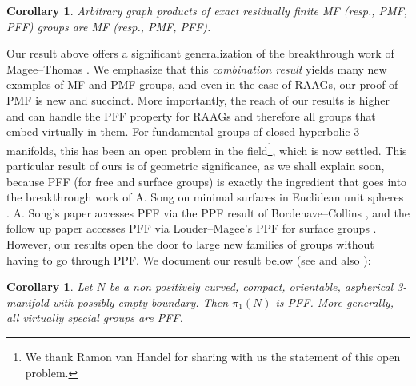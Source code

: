 \documentclass[10pt]{amsart}
\newtheorem{col}[thm]{Corollary}
\theoremstyle{definition}
\begin{document}
\begin{col}\label{graph pdoructs cor}
    Arbitrary graph products of exact residually finite MF (resp., PMF, PFF) groups are MF (resp., PMF, PFF). 
\end{col}

Our result above offers a significant generalization of the breakthrough work of Magee--Thomas \cite{MageeThomas2023}. We emphasize that this \emph{combination result} yields many new examples of MF and PMF groups, and even in the case of RAAGs, our proof of PMF is new and succinct. More importantly, the reach of our results is higher and can handle the PFF property for RAAGs and therefore all groups that embed virtually in them. For fundamental groups of closed hyperbolic 3-manifolds, this has been an open problem in the field\footnote{We thank Ramon van Handel for sharing with us the statement of this open problem.}, which is now settled. This particular result of ours is of geometric significance, as we shall explain soon, because PFF (for free and surface groups) is exactly the ingredient that goes into the breakthrough work of A. Song on minimal surfaces in Euclidean unit spheres \cite{song2025randomharmonicmapsspheres}. A. Song's paper accesses PFF via the PPF result of Bordenave--Collins \cite{BordenaveCollins2019}, and the follow up paper \cite{ancona2025minimalsurfacesnegativecurvature} accesses PFF via Louder--Magee's PPF for surface groups \cite{loudermagee2025limitgroups}. However, our results open the door to large new families of groups without having to go through PPF.   We document our result below (see \cite{Agol2013, HaglundWise2008} and also \cite[Theorem 5.27]{aschenbrenner2015manifold}): 

\begin{col}\label{Song cor}
Let $N$ be a non positively curved, compact, orientable,
aspherical 3-manifold with possibly empty boundary. Then $\pi_1(N)$ is PFF. More generally, all virtually special groups are PFF.
\end{col}
\end{document}
